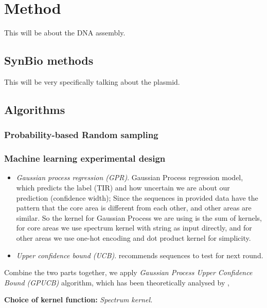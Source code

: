 \section{Method}
This will be about the DNA assembly.\\
\subsection{SynBio methods}
This will be very specifically talking about the plasmid.

\subsection{Algorithms}

\subsubsection{Probability-based Random sampling}

\subsubsection{Machine learning experimental design}



\begin{itemize}
    \item \textit{Gaussian process regression (GPR)}. Gaussian Process regression model, which predicts the label (TIR) and how uncertain we are about our prediction (confidence width); Since the sequences in provided data have the pattern that the core area is different from each other, and other areas are similar. So the kernel for Gaussian Process we are using is the sum of kernels, for core areas we use spectrum kernel with string as input directly, and for other areas we use one-hot encoding and dot product kernel for simplicity.
    \item \textit{Upper confidence bound (UCB)}. recommends sequences to test for next round.
\end{itemize}

Combine the two parts together, we apply \textit{Gaussian Process Upper Confidence Bound (GPUCB)} algorithm, which has been theoretically analysed by \textcite{srinivas2012information}, 

\textbf{Choice of kernel function:} \textit{Spectrum kernel.}
